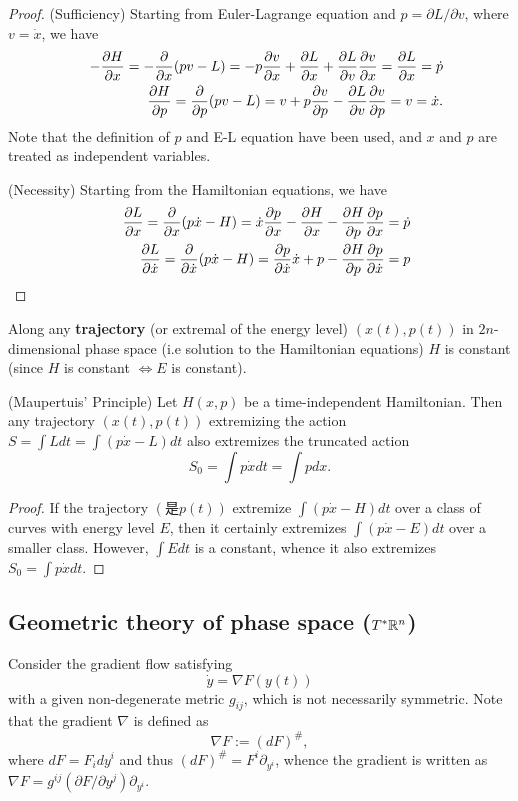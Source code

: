 \begin{proof}
	(Sufficiency) Starting from Euler-Lagrange equation and $p = \partial L/ \partial v$, where $v = \dot{x}$, we have
	\begin{eqnarray}
		&&-\frac{ \partial H}{ \partial x } = -\frac{ \partial  }{ \partial x } (pv - L) = - p \frac{ \partial v}{ \partial x } + \frac{ \partial L}{ \partial x } + \frac{ \partial L}{ \partial v }\frac{ \partial v}{ \partial x } = \frac{ \partial L}{ \partial x } = \dot{p}
		\nonumber\\
		&&\frac{ \partial H}{ \partial p } = \frac{ \partial  }{ \partial p } (pv - L) = v + p \frac{ \partial v}{ \partial p } - \frac{ \partial L}{ \partial v } \frac{ \partial v}{ \partial p } = v = \dot{x}.
		\nonumber
	\end{eqnarray}
	Note that the definition of $p$ and E-L equation have been used, and $x$ and $p$ are treated as independent variables.
	
	(Necessity) Starting from the Hamiltonian equations, we have
	\begin{eqnarray}
		&&\frac{ \partial L}{ \partial x } = \frac{ \partial  }{ \partial x }(p\dot{x} - H) = \dot{x} \frac{ \partial p}{ \partial x } - \frac{ \partial H}{ \partial x } - \frac{ \partial H}{ \partial p } \frac{ \partial p}{ \partial x } = \dot{p}
		\nonumber\\
		&&\frac{ \partial L}{ \partial \dot{x} } = \frac{ \partial  }{ \partial \dot{x} }(p\dot{x} - H) = \frac{ \partial p}{ \partial \dot{x} } \dot{x} + p - \frac{ \partial H}{ \partial p } \frac{ \partial p}{ \partial \dot{x} } = p
		\nonumber
	\end{eqnarray}
\end{proof}

\begin{corollary}
	Along any \textbf{trajectory} (or extremal of the energy level) $(x(t), p(t))$ in $2n$-dimensional phase space (i.e solution to the Hamiltonian equations) $H$ is constant (since $H$ is constant $\iff E$ is constant).
\end{corollary}

\begin{theorem}
	(Maupertuis' Principle) Let $H(x, p)$ be a time-independent Hamiltonian. Then any trajectory $(x(t), p(t))$ extremizing the action $S = \int L dt = \int (p\dot{x} - L) dt$ also extremizes the truncated action
	\[ S_0 = \int p\dot{x} dt = \int p dx. \]
\end{theorem}
\begin{proof}
	If the trajectory $(是p(t))$ extremize $\int (p\dot{x} - H) dt$ over a class of curves with energy level $E$, then it certainly extremizes $\int (p\dot{x} - E) dt$ over a smaller class. However, $\int E dt$ is a constant, whence it also extremizes $S_0 = \int p\dot{x} dt$.
\end{proof}


\subsection{Geometric theory of phase space ($T^*\mathbb{R}^n$)}
Consider the gradient flow satisfying
\[\dot{y} = \nabla F(y(t))\]
with a given non-degenerate metric $g_{ij}$, which is not necessarily symmetric. Note that the gradient $\nabla$ is defined as \[ \nabla F := (dF)^\#, \] where $dF = F_i dy^i$ and thus $(dF)^\# = F^i \partial_{y^i}$, whence the gradient is written as $\nabla F = g^{ij} (\partial F/ \partial y^j) \partial_{y^i}$.

